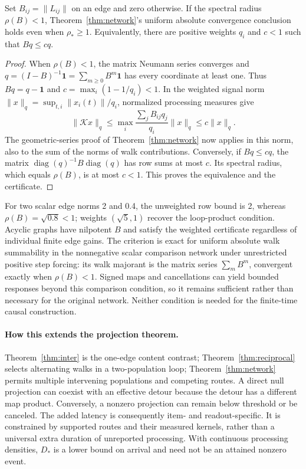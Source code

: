 \begin{lemma}\label{lem:weighted-network}
Set $B_{ij}=\|L_{ij}\|$ on an edge and zero otherwise. If the spectral radius $\rho(B)<1$, Theorem~\ref{thm:network}'s uniform absolute convergence conclusion holds even when $\rho_*\ge1$. Equivalently, there are positive weights $q_i$ and $c<1$ such that $Bq\le cq$.
\end{lemma}
\begin{proof}
When $\rho(B)<1$, the matrix Neumann series converges and $q=(I-B)^{-1}\mathbf1=\sum_{m\ge0}B^m\mathbf1$ has every coordinate at least one. Thus $Bq=q-\mathbf1$ and $c=\max_i(1-1/q_i)<1$. In the weighted signal norm $\|x\|_q=\sup_{t,i}\|x_i(t)\|/q_i$, normalized processing measures give
\[
\|\mathcal Kx\|_q\le\max_i\frac{\sum_j B_{ij}q_j}{q_i}\|x\|_q\le c\|x\|_q.
\]
The geometric-series proof of Theorem~\ref{thm:network} now applies in this norm, also to the sum of the norms of walk contributions. Conversely, if $Bq\le cq$, the matrix $\operatorname{diag}(q)^{-1}B\operatorname{diag}(q)$ has row sums at most $c$. Its spectral radius, which equals $\rho(B)$, is at most $c<1$. This proves the equivalence and the certificate.
\end{proof}
For two scalar edge norms 2 and 0.4, the unweighted row bound is 2, whereas $\rho(B)=\sqrt{0.8}<1$; weights $(\sqrt5,1)$ recover the loop-product condition. Acyclic graphs have nilpotent $B$ and satisfy the weighted certificate regardless of individual finite edge gains. The criterion is exact for uniform absolute walk summability in the nonnegative scalar comparison network under unrestricted positive step forcing: its walk majorant is the matrix series $\sum_m B^m$, convergent exactly when $\rho(B)<1$. Signed maps and cancellations can yield bounded responses beyond this comparison condition, so it remains sufficient rather than necessary for the original network. Neither condition is needed for the finite-time causal construction.

\paragraph{How this extends the projection theorem.} Theorem~\ref{thm:inter} is the one-edge content contrast; Theorem~\ref{thm:reciprocal} selects alternating walks in a two-population loop; Theorem~\ref{thm:network} permits multiple intervening populations and competing routes. A direct null projection can coexist with an effective detour because the detour has a different map product. Conversely, a nonzero projection can remain below threshold or be canceled. The added latency is consequently item- and readout-specific. It is constrained by supported routes and their measured kernels, rather than a universal extra duration of unreported processing. With continuous processing densities, $D_*$ is a lower bound on arrival and need not be an attained nonzero event.

